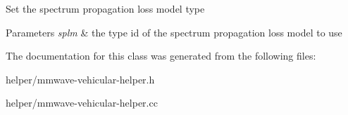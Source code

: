 Set the spectrum propagation loss model type 
\begin{DoxyParams}{Parameters}
{\em splm} & the type id of the spectrum propagation loss model to use \\
\hline
\end{DoxyParams}


The documentation for this class was generated from the following files\+:\begin{DoxyCompactItemize}
\item 
helper/mmwave-\/vehicular-\/helper.\+h\item 
helper/mmwave-\/vehicular-\/helper.\+cc\end{DoxyCompactItemize}
